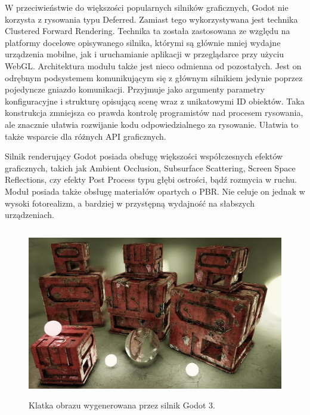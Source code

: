 \begin{itemize}
	W przeciwieństwie do większości popularnych silników graficznych, Godot nie korzysta z rysowania typu Deferred. Zamiast tego wykorzystywana jest technika Clustered Forward Rendering. \cite{godot:rendererdesign:2024} Technika ta została zastosowana ze względu na platformy docelowe opisywanego silnika, którymi są głównie mniej wydajne urządzenia mobilne, jak i uruchamianie aplikacji w przeglądarce przy użyciu WebGL.
	Architektura modułu także jest nieco odmienna od pozostałych. Jest on odrębnym podsystemem komunikującym się z głównym silnikiem jedynie poprzez pojedyncze gniazdo komunikacji. Przyjmuje jako argumenty parametry konfiguracyjne i strukturę opisującą scenę wraz z unikatowymi ID obiektów. Taka konstrukcja zmniejsza co prawda kontrolę programistów nad procesem rysowania, ale znacznie ułatwia rozwijanie kodu odpowiedzialnego za rysowanie. Ułatwia to także wsparcie dla różnych API graficznych.

	Silnik renderujący Godot posiada obsługę większości współczesnych efektów graficznych, takich jak Ambient Occlusion, Subsurface Scattering, Screen Space Reflections, czy efekty Post Process typu głębi ostrości, bądź rozmycia w ruchu. Moduł posiada także obsługę materiałów opartych o PBR. Nie celuje on jednak w wysoki fotorealizm, a bardziej w przystępną wydajność na słabszych urządzeniach.

	\begin{figure}[htbp]
		\centering
		\includegraphics[width=4.90152in,height=2.92893in]{images/18_Godot_3_example.jpg}
		\caption{Klatka obrazu wygenerowana przez silnik Godot 3. \cite{godot:rendererdesign:2024}}
	\end{figure}
\end{itemize}